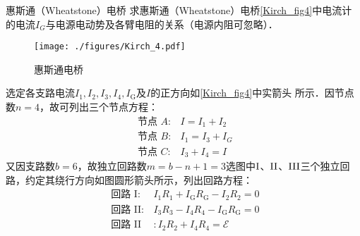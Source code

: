 \begin{example}{惠斯通（Wheatstone）电桥}
求惠斯通（Wheatstone）电桥\autoref{Kirch_fig4}中电流计的电流$I_G$与电源电动势及各臂电阻的关系（电源内阻可忽略）．
\begin{figure}[ht]
\centering
\texttt{[image: ./figures/Kirch\_4.pdf]}
\caption{惠斯通电桥} \label{Kirch_fig4}
\end{figure}

选定各支路电流$I_{1}, I_{2}, I_{3}, I_{4}, I_{\mathrm{G}}$及$I $的正方向如\autoref{Kirch_fig4}中实箭头
所示．因节点数$n = 4$，故可列出三个节点方程：
\begin{equation}
\begin{array}{ll}\text { 节点 } A: & I=I_{1}+I_{2} \\ \text { 节点 } B: & I_{1}=I_{3}+I_{G} \\ \text { 节点 } C: & I_{3}+I_{4}=I\end{array}
\end{equation}
又因支路数$b=6$，故独立回路数$m=b-n+1=3$选图中$\rm I$、$\rm II$、$\rm III$三个独立回路，约定其绕行方向如图圆形箭头所示，列出回路方程：
\begin{equation}
\begin{array}{ll}\text { 回路 } \mathrm{I}: & I_{1} R_{1}+I_{\mathrm{G}} R_{\mathrm{G}}-I_{2} R_{2}=0 \\ \text { 回路 } \mathrm{II}: & I_{3} R_{3}-I_{4} R_{4}-I_{\mathrm{G}} R_{\mathrm{G}}=0 \\ \text { 回路 } \mathrm{II} & :  I_{2} R_{2}+I_{4} R_{4}=\mathscr{E}\end{array}
\end{equation}
\end{example}
